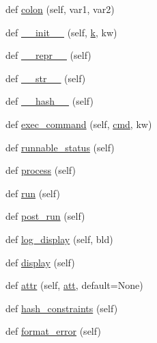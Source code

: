 \begin{DoxyCompactItemize}
\item 
def \hyperlink{classwaflib_1_1_task_1_1_task_base_ae9648ec691e059291a79f38ef6ee12cc}{colon} (self, var1, var2)
\item 
def \hyperlink{classwaflib_1_1_task_1_1_task_base_add6ae927b00bd1f14d5b87738dd53e70}{\+\_\+\+\_\+init\+\_\+\+\_\+} (self, \hyperlink{rfft2d_test_m_l_8m_adc468c70fb574ebd07287b38d0d0676d}{k}, kw)
\item 
def \hyperlink{classwaflib_1_1_task_1_1_task_base_a004a67fbb5d7e36d1a6ba48390e0d5f7}{\+\_\+\+\_\+repr\+\_\+\+\_\+} (self)
\item 
def \hyperlink{classwaflib_1_1_task_1_1_task_base_a07123f80c95b1d17a699064cd10d8885}{\+\_\+\+\_\+str\+\_\+\+\_\+} (self)
\item 
def \hyperlink{classwaflib_1_1_task_1_1_task_base_a5e02f89716bcd37b2490adc0861c4bdd}{\+\_\+\+\_\+hash\+\_\+\+\_\+} (self)
\item 
def \hyperlink{classwaflib_1_1_task_1_1_task_base_a6326ff82d67a2b629c8d78b95cb8fec6}{exec\+\_\+command} (self, \hyperlink{sndfile__play_8m_adfc5ba7e22f5e4a6221c12a70503bef3}{cmd}, kw)
\item 
def \hyperlink{classwaflib_1_1_task_1_1_task_base_a10c4597d9085bd1680f9b3eb28e23899}{runnable\+\_\+status} (self)
\item 
def \hyperlink{classwaflib_1_1_task_1_1_task_base_ae5e951a187c8d09c31960bbcf76fad25}{process} (self)
\item 
def \hyperlink{classwaflib_1_1_task_1_1_task_base_ae549bc1a80fd94cc94fd1e764c76895c}{run} (self)
\item 
def \hyperlink{classwaflib_1_1_task_1_1_task_base_a21b09d3f18df76e1d8b0719f321ea3bd}{post\+\_\+run} (self)
\item 
def \hyperlink{classwaflib_1_1_task_1_1_task_base_adf380fd031fc987f4dcd54e1f70420a7}{log\+\_\+display} (self, bld)
\item 
def \hyperlink{classwaflib_1_1_task_1_1_task_base_a838316cf55ac50fab2ae0e8771917e74}{display} (self)
\item 
def \hyperlink{classwaflib_1_1_task_1_1_task_base_a8ead2ec09545f4e9e27d6b40f9f80eaa}{attr} (self, \hyperlink{filters_8h_a6cbe32dd86cefd1a8b182b3ee652e9bf}{att}, default=None)
\item 
def \hyperlink{classwaflib_1_1_task_1_1_task_base_ad4f2583a59ff62565735490154826033}{hash\+\_\+constraints} (self)
\item 
def \hyperlink{classwaflib_1_1_task_1_1_task_base_a321e667402035aa56626ee6f7b3b8223}{format\+\_\+error} (self)
\item 

\end{DoxyCompactItemize}
